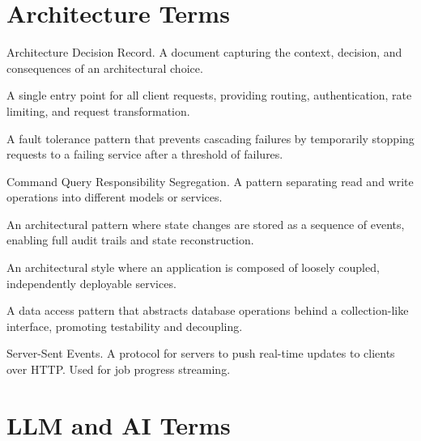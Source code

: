 \section{Architecture Terms}
\label{app:glossary:architecture}

\begin{description}[style=nextline,leftmargin=2cm,labelwidth=1.8cm]

\item[ADR]
Architecture Decision Record. A document capturing the context, decision, and consequences of an architectural choice.

\item[API Gateway]
A single entry point for all client requests, providing routing, authentication, rate limiting, and request transformation.

\item[Circuit Breaker]
A fault tolerance pattern that prevents cascading failures by temporarily stopping requests to a failing service after a threshold of failures.

\item[CQRS]
Command Query Responsibility Segregation. A pattern separating read and write operations into different models or services.

\item[Event Sourcing]
An architectural pattern where state changes are stored as a sequence of events, enabling full audit trails and state reconstruction.

\item[Microservices]
An architectural style where an application is composed of loosely coupled, independently deployable services.

\item[Repository Pattern]
A data access pattern that abstracts database operations behind a collection-like interface, promoting testability and decoupling.

\item[SSE]
Server-Sent Events. A protocol for servers to push real-time updates to clients over HTTP. Used for job progress streaming.

\end{description}

\section{LLM and AI Terms}
\label{app:glossary:llm}

